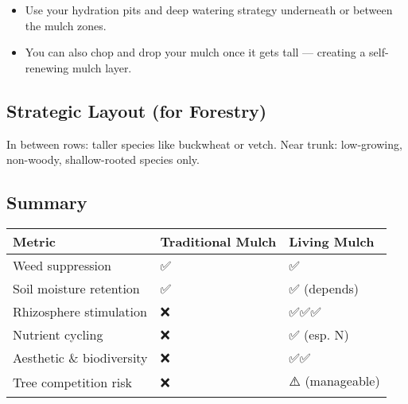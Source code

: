 \documentclass{article}
\begin{document}
\begin{itemize}
    \item Use your hydration pits and deep watering strategy underneath or between the mulch zones.
    \item You can also chop and drop your mulch once it gets tall — creating a self-renewing mulch layer.
\end{itemize}

\subsection*{Strategic Layout (for Forestry)}


In between rows: taller species like buckwheat or vetch. Near trunk: low-growing, non-woody, shallow-rooted species only.

\subsection*{Summary}

\begin{tabular}{|l|l|l|}
\hline
\textbf{Metric} & \textbf{Traditional Mulch} & \textbf{Living Mulch} \\ \hline
Weed suppression & ✅ & ✅ \\ \hline
Soil moisture retention & ✅ & ✅ (depends) \\ \hline
Rhizosphere stimulation & ❌ & ✅✅✅ \\ \hline
Nutrient cycling & ❌ & ✅ (esp. N) \\ \hline
Aesthetic \& biodiversity & ❌ & ✅✅ \\ \hline
Tree competition risk & ❌ & ⚠️ (manageable) \\ \hline
\end{tabular}
\end{document}
